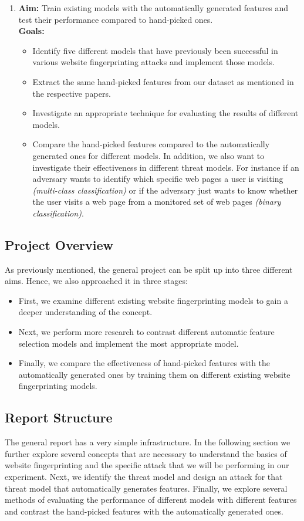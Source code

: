 \begin{enumerate}
   \item \textbf{Aim:} Train existing models with the automatically generated features and test their performance compared to hand-picked ones.\\
   \textbf{Goals:}
   \begin{itemize}
      \item Identify five different models that have previously been successful in various website fingerprinting attacks and implement those models.
      \item Extract the same hand-picked features from our dataset as mentioned in the respective papers.
      \item Investigate an appropriate technique for evaluating the results of different models.
      \item Compare the hand-picked features compared to the automatically generated ones for different models. In addition, we also want to investigate
         their effectiveness in different threat models. For instance if an adversary wants to identify which specific web pages a user is visiting \textit{(multi-class classification)} or
         if the adversary just wants to know whether the user visits a web page from a monitored set of web pages \textit{(binary classification)}.
   \end{itemize}

\end{enumerate}

\newpage

\subsection{Project Overview}
As previously mentioned, the general project can be split up into three different aims. Hence, we also approached it in three stages:

\begin{itemize}
\item First, we examine different existing website fingerprinting models to gain a deeper understanding of the concept.
\item Next, we perform more research to contrast different automatic feature selection models and implement the most appropriate model.
\item Finally, we compare the effectiveness of hand-picked features with the automatically generated ones by training them on different existing website fingerprinting models.
\end{itemize}


\subsection{Report Structure}
The general report has a very simple infrastructure. In the following section we further explore several concepts that are necessary
to understand the basics of website fingerprinting and the specific attack that we will be performing in our experiment.
Next, we identify the threat model and design an attack for that threat model that automatically generates features.
Finally, we explore several methods of evaluating the performance of different models with different features and contrast the hand-picked
features with the automatically generated ones.
